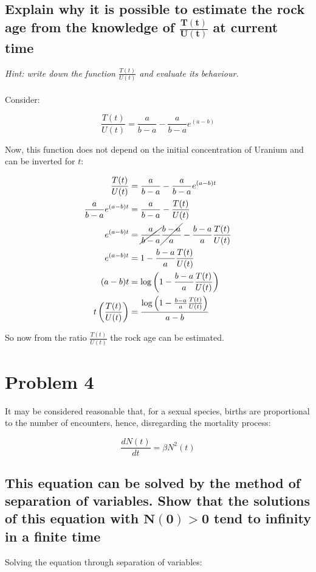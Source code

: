   \subsection{Explain why it is possible to estimate the rock age from the knowledge of $\mathbf{\frac{T(t)}{U(t)}}$ at current time}
  \textit{Hint: write down the function $\frac{T(t)}{U(t)}$ and evaluate its behaviour.}
  \\
  \\
  Consider:

  $$\frac{T(t)}{U(t)} = \frac{a}{b-a} - \frac{a}{b-a}e^{(a-b)}$$

  Now, this function does not depend on the initial concentration of Uranium and can be inverted for $t$:

  \begin{align*}
    \frac{T(t)}{U(t)} &= \frac{a}{b-a} - \frac{a}{b-a}e^{(a-b)t}\\
    \frac{a}{b-a}e^{(a-b)t} &= \frac{a}{b-a} - \frac{T(t)}{U(t)}  \\
    e^{(a-b)t} &= \cancel{\frac{a}{b-a}}\cancel{\frac{b-a}{a}} - \frac{b-a}{a}\frac{T(t)}{U(t)}  \\
    e^{(a-b)t} &= 1 - \frac{b-a}{a}\frac{T(t)}{U(t)}\\
    (a-b)t &= \log\left(1 - \frac{b-a}{a}\frac{T(t)}{U(t)}\right)\\
    t\left(\frac{T(t)}{U(t)}\right) &= \frac{\log\left(1 - \frac{b-a}{a}\frac{T(t)}{U(t)}\right)}{a-b}
  \end{align*}

  So now from the ratio $\frac{T(t)}{U(t)}$ the rock age can be estimated.

\section{Problem 4}
It may be considered reasonable that, for a sexual species, births are proportional to the number of encounters, hence, disregarding the mortality process:

$$\frac{dN(t)}{dt} = \beta N^2(t)$$

  \subsection{This equation can be solved by the method of separation of variables. Show that the solutions of this equation with $\mathbf{N(0) > 0}$ tend to infinity in a finite time}
  Solving the equation through separation of variables:

